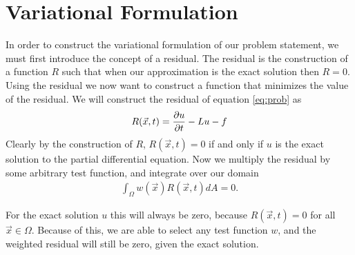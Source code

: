 \documentclass[../fem.tex]{subfile}
\begin{document}
\section{Variational Formulation}%
\label{sec:variational_formulation}

In order to construct the variational formulation of our problem statement,
we must first introduce the concept of a residual. The residual is the
construction of a function $R$ such that when our approximation is the exact
solution then $R=0$. Using the residual we now want to construct a function
that minimizes the value of the residual. We will construct the residual of
equation \ref{eq:prob} as
\begin{align*}
  R(\vec{x},t)=\frac{\partial u}{\partial t}-Lu-f
\end{align*}
Clearly by the construction of $R$, $R(\vec{x},t)=0$ if and only if $u$ is the
exact solution to the partial differential equation. Now we multiply the
residual by some arbitrary test function, and integrate over our domain
\begin{align*}
  \int_\Omega w(\vec{x})R(\vec{x},t)dA=0.
\end{align*}

For the exact solution $u$ this will always be zero, because $R(\vec{x},t)=0$
for all $\vec{x}\in\Omega$. Because of this, we are able to select any test
function $w$, and the weighted residual will still be zero, given the exact
solution.
\end{document}
